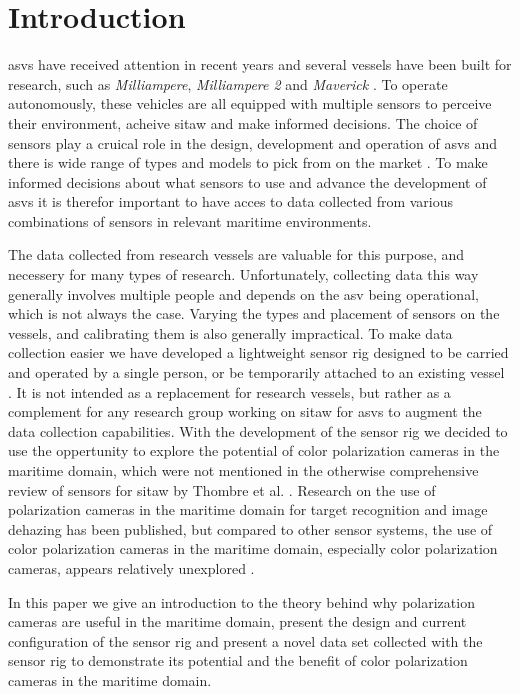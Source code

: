 \section{Introduction}
\glspl{asv} have received attention in recent years and several vessels have been built for research, such as \textit{Milliampere}, \textit{Milliampere 2} and \textit{Maverick} \cite{brekkeMilliAmpereAutonomousFerry2022}\cite{zhangDesignBuildAutonomous2023}\cite{eideAutonomousUrbanPassenger2024}.
To operate autonomously, these vehicles are all equipped with multiple sensors to perceive their environment, acheive \gls{sitaw} and make informed decisions.
The choice of sensors play a cruical role in the design, development and operation of \glspl{asv} and there is wide range of types and models to pick from on the market \cite{thombreSensorsAITechniques2022}.
To make informed decisions about what sensors to use and advance the development of \glspl{asv} it is therefor important to have acces to data collected from various combinations  of sensors in relevant maritime environments.

The data collected from research vessels are valuable for this purpose, and necessery for many types of research.
Unfortunately, collecting data this way generally involves multiple people and depends on the \gls{asv} being operational, which is not always the case.
Varying the types and placement of sensors on the vessels, and calibrating them is also generally impractical.
To make data collection easier we have developed a lightweight sensor rig designed to be carried and operated by a single person, or be temporarily attached to an existing vessel \cite{martensPavingWayEnhanced2023}.
It is not intended as a replacement for research vessels, but rather as a complement for any research group working on \gls{sitaw} for \glspl{asv} to augment the data collection capabilities.
With the development of the sensor rig we decided to use the oppertunity to explore the potential of color polarization cameras in the maritime domain, which were not mentioned in the otherwise comprehensive review of sensors for \gls{sitaw} by Thombre et al. \cite{thombreSensorsAITechniques2022}.
Research on the use of polarization cameras in the maritime domain for target recognition and image dehazing has been published, but compared to other sensor systems, the use of color polarization cameras in the maritime domain, especially color polarization cameras, appears relatively unexplored \cite{zhongPolarizationintensityJointImaging2023}\cite{maPolarizationBasedMethodMaritime2024}.

In this paper we give an introduction to the theory behind why polarization cameras are useful in the maritime domain, present the design and current configuration of the sensor rig and present a novel data set collected with the sensor rig to demonstrate its potential and the benefit of color polarization cameras in the maritime domain.

